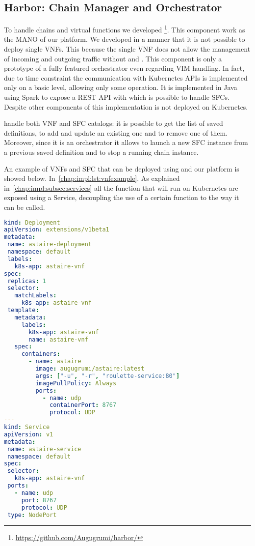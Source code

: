 \subsection{Harbor: Chain Manager and Orchestrator}
To handle chains and virtual functions we developed
\harbor{}\footnote{\url{https://github.com/Augugrumi/harbor/}}. This component
work as the MANO of our platform. We developed \harbor{} in a manner that it
is not possible to deploy single VNFs. This because the single VNF does not
allow the management of incoming and outgoing traffic without \ingresses{} and
\egresses{}. This component is only a prototype of a fully featured orchestrator
even regarding VIM handling. In fact, due to time constraint the communication
with Kubernetes APIs is implemented only on a basic level, allowing only some
operation. It is implemented in Java using Spark to expose a REST API with which
is possible to handle SFCs. Despite other components of this implementation 
\harbor{} is not deployed on Kubernetes.

\harbor{} handle both VNF and SFC catalogs: it is possible to get the list of
saved definitions, to add and update an existing one and to remove one of them.
Moreover, since it is an orchestrator it allows to launch a new SFC instance
from a previous saved definition and to stop a running chain instance.

An example of VNFs and SFC that can be deployed using \harbor{} and our platform
is showed below. In~\ref{chap:impl:lst:vnfexample}. As explained 
in~\ref{chap:impl:subsec:services} all the function that will run on Kubernetes
are exposed using a Service, decoupling the use of a certain function to the way
it can be called.
\begin{lstlisting}[caption={Example of VNF definition}, captionpos=b,
                   language=yaml, label=chap:impl:lst:vnfexample]
kind: Deployment
apiVersion: extensions/v1beta1
metadata:
 name: astaire-deployment
 namespace: default
 labels:
   k8s-app: astaire-vnf
spec:
 replicas: 1
 selector:
   matchLabels:
     k8s-app: astaire-vnf
 template:
   metadata:
     labels:
       k8s-app: astaire-vnf
       name: astaire-vnf
   spec:
     containers:
       - name: astaire
         image: augugrumi/astaire:latest
         args: ["-u", "-r", "roulette-service:80"]
         imagePullPolicy: Always
         ports:
           - name: udp
             containerPort: 8767
             protocol: UDP
---
kind: Service
apiVersion: v1
metadata:
 name: astaire-service
 namespace: default
spec:
 selector:
   k8s-app: astaire-vnf
 ports:
   - name: udp
     port: 8767
     protocol: UDP
 type: NodePort
\end{lstlisting}

